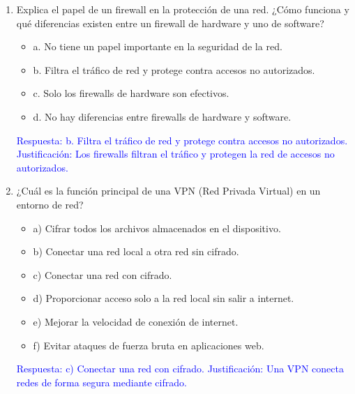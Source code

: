 \documentclass[a4paper]{article}
\begin{document}
\begin{enumerate}
    \item Explica el papel de un firewall en la protección de una red. 
    ¿Cómo funciona y qué diferencias existen entre un firewall de hardware y uno de software?
    \begin{itemize}
        \item a. No tiene un papel importante en la seguridad de la red.
        \item b. Filtra el tráfico de red y protege contra accesos no autorizados.
        \item c. Solo los firewalls de hardware son efectivos.
        \item d. No hay diferencias entre firewalls de hardware y software.
    \end{itemize}
    \textcolor{blue}{Respuesta: b. Filtra el tráfico de red y protege contra accesos no autorizados. Justificación: Los firewalls filtran el tráfico y protegen la red de accesos no autorizados.}
    \vspace{1cm}
    
    \item ¿Cuál es la función principal de una VPN (Red Privada Virtual) en un entorno de red?
    \begin{itemize}
        \item a) Cifrar todos los archivos almacenados en el dispositivo.
        \item b) Conectar una red local a otra red sin cifrado.
        \item c) Conectar una red con cifrado.
        \item d) Proporcionar acceso solo a la red local sin salir a internet.
        \item e) Mejorar la velocidad de conexión de internet.
        \item f) Evitar ataques de fuerza bruta en aplicaciones web.
    \end{itemize}
    \textcolor{blue}{Respuesta: c) Conectar una red con cifrado. Justificación: Una VPN conecta redes de forma segura mediante cifrado.}
    \vspace{1cm}
    

\end{enumerate}
\end{document}
